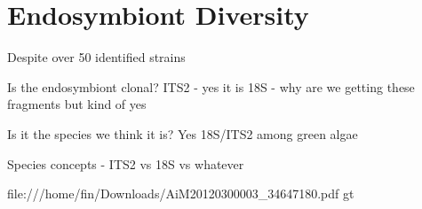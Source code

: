% 
\graphicspath{{chapters/3.Chapter_1/figures}}

\chapter{Endosymbiont Diversity}\label{chap:endo_diversity}


Despite over 50 identified strains 


Is the endosymbiont clonal?
ITS2 - yes it is
18S - why are we getting these fragments but kind of yes

Is it the species we think it is?
Yes 18S/ITS2 among green algae

Species concepts  - ITS2 vs 18S vs whatever \citep{Boenigk2012}

file:///home/fin/Downloads/AiM20120300003_34647180.pdf
gt
